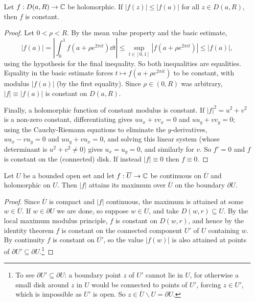 \documentclass[a4paper]{scrartcl}
\begin{document}
\begin{theorem}
    Let $f: D(a, R) \rightarrow \mathbb{C}$ be holomorphic. If $|f(z)| \leq |f(a)|$ for all $z \in D(a, R)$, then $f$ is constant.
\end{theorem}
\begin{proof}
    Let $0 < \rho < R$. By the mean value property and the basic estimate,
    $$
    |f(a)| = \left|\int_0^1 f(a + \rho e^{2 \pi i t}) \dd t\right| \leq \sup_{t \in [0, 1]}|f(a + \rho e^{2 \pi i t})| \leq |f(a)|,
    $$
    using the hypothesis for the final inequality. So both inequalities are equalities. Equality in the basic estimate forces $t \mapsto f(a + \rho e^{2 \pi i t})$ to be constant, with modulus $|f(a)|$ (by the first equality). Since $\rho \in (0, R)$ was arbitrary, $|f| \equiv |f(a)|$ is constant on $D(a, R)$.

    Finally, a holomorphic function of constant modulus is constant. If $|f|^2 = u^2 + v^2$ is a non-zero constant, differentiating gives $u u_x + v v_x = 0$ and $u u_y + v v_y = 0$; using the Cauchy-Riemann equations to eliminate the $y$-derivatives, $u u_x - v u_y = 0$ and $u u_y + v u_x = 0$, and solving this linear system (whose determinant is $u^2 + v^2 \neq 0$) gives $u_x = u_y = 0$, and similarly for $v$. So $f' = 0$ and $f$ is constant on the (connected) disk. If instead $|f| \equiv 0$ then $f \equiv 0$.
\end{proof}

\begin{corollary}
    Let $U$ be a bounded open set and let $f: \overline{U} \rightarrow \mathbb{C}$ be continuous on $\overline{U}$ and holomorphic on $U$. Then $|f|$ attains its maximum over $\overline{U}$ on the boundary $\partial U$.
\end{corollary}
\begin{proof}
    Since $\overline{U}$ is compact and $|f|$ continuous, the maximum is attained at some $w \in \overline{U}$. If $w \in \partial U$ we are done, so suppose $w \in U$, and take $D(w, r) \subseteq U$. By the local maximum modulus principle, $f$ is constant on $D(w, r)$, and hence by the identity theorem $f$ is constant on the connected component $U'$ of $U$ containing $w$. By continuity $f$ is constant on $\overline{U'}$, so the value $|f(w)|$ is also attained at points of $\partial U' \subseteq \partial U$.\footnote{To see $\partial U' \subseteq \partial U$: a boundary point $z$ of $U'$ cannot lie in $U$, for otherwise a small disk around $z$ in $U$ would be connected to points of $U'$, forcing $z \in U'$, which is impossible as $U'$ is open. So $z \in \overline{U} \backslash U = \partial U$.}
\end{proof}
\end{document}
